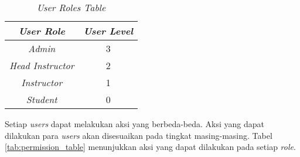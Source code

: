 \begin{table}[H]
	\centering 
	\caption{\textit{User Roles Table}}
	\label{tab:user_role}
	\begin{tabular}{|c|c|}
		\hline
		\textit{\textbf{User Role}} & \textit{\textbf{User Level}} \\
		\hline
		\textit{Admin} & 3 \\
		\hline
		\textit{Head Instructor} & 2 \\
		\hline
		\textit{Instructor} & 1 \\
		\hline
		\textit{Student} & 0 \\
		\hline		
	\end{tabular} 
\end{table}

Setiap \textit{users} dapat melakukan aksi yang berbeda-beda. Aksi yang dapat dilakukan para \textit{users} akan disesuaikan pada tingkat masing-masing. Tabel \ref{tab:permission_table} menunjukkan aksi yang dapat dilakukan pada setiap \textit{role}.

